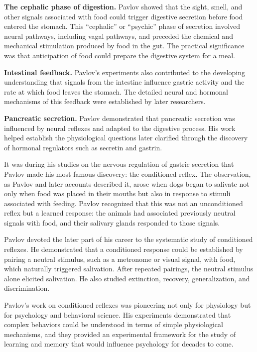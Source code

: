 \textbf{The cephalic phase of digestion.} Pavlov showed that the sight, smell, and other signals associated with food could trigger digestive secretion before food entered the stomach. This ``cephalic'' or ``psychic'' phase of secretion involved neural pathways, including vagal pathways, and preceded the chemical and mechanical stimulation produced by food in the gut. The practical significance was that anticipation of food could prepare the digestive system for a meal.

\textbf{Intestinal feedback.} Pavlov's experiments also contributed to the developing understanding that signals from the intestine influence gastric activity and the rate at which food leaves the stomach. The detailed neural and hormonal mechanisms of this feedback were established by later researchers.

\textbf{Pancreatic secretion.} Pavlov demonstrated that pancreatic secretion was influenced by neural reflexes and adapted to the digestive process. His work helped establish the physiological questions later clarified through the discovery of hormonal regulators such as secretin and gastrin.\cite{pavlov-physiology}

It was during his studies on the nervous regulation of gastric secretion that Pavlov made his most famous discovery: the conditioned reflex. The observation, as Pavlov and later accounts described it, arose when dogs began to salivate not only when food was placed in their mouths but also in response to stimuli associated with feeding. Pavlov recognized that this was not an unconditioned reflex but a learned response: the animals had associated previously neutral signals with food, and their salivary glands responded to those signals.\cite{pavlov-conditioning}

Pavlov devoted the later part of his career to the systematic study of conditioned reflexes. He demonstrated that a conditioned response could be established by pairing a neutral stimulus, such as a metronome or visual signal, with food, which naturally triggered salivation. After repeated pairings, the neutral stimulus alone elicited salivation. He also studied extinction, recovery, generalization, and discrimination.\cite{pavlov-conditioning}

Pavlov's work on conditioned reflexes was pioneering not only for physiology but for psychology and behavioral science. His experiments demonstrated that complex behaviors could be understood in terms of simple physiological mechanisms, and they provided an experimental framework for the study of learning and memory that would influence psychology for decades to come.

